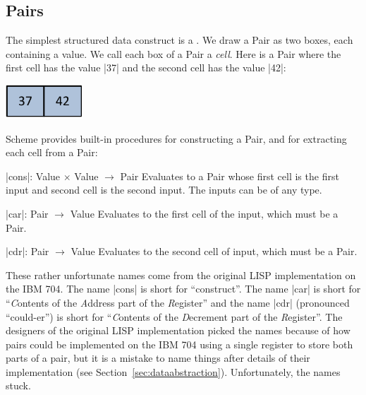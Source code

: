 \begin{schemeregion}
\section{Pairs}  

The simplest structured data construct is a .  We draw a Pair as two boxes, each containing a value.  We call each box of a Pair a \emph{cell}.  Here is a Pair where the first cell has the value \schemeresult|37| and the second cell has the value \schemeresult|42|:

\begin{centernospace}
\includegraphics[height=0.5in]{figures/pair.pdf}
\end{centernospace}

Scheme provides built-in procedures for constructing a Pair, and for extracting each cell from a Pair:

\begin{descriptionlist}
\item[\scheme|cons|: Value $\times$ Value $\rightarrow$ Pair] \forcenl Evaluates to a Pair whose first cell is the first input and second cell is the second input.  The inputs can be of any type.
\item[\scheme|car|: Pair $\rightarrow$ Value] \forcenl Evaluates to the first cell of the input, which must be a Pair.
\item[\scheme|cdr|: Pair $\rightarrow$ Value] \forcenl Evaluates to the second cell of input, which must be a Pair.
\end{descriptionlist}

These rather unfortunate names come from the original LISP implementation on the IBM 704.  The name \scheme|cons| is short for ``construct''.  The name \scheme|car| is short for ``\emph{C}ontents of the \emph{A}ddress part of the \emph{R}egister'' and the name \scheme|cdr| (pronounced ``could-er'') is short for ``\emph{C}ontents of the \emph{D}ecrement part of the \emph{R}egister''.  The designers of the original LISP implementation picked the names because of how pairs could be implemented on the IBM 704 using a single register to store both parts of a pair, but it is a mistake to name things after details of their implementation (see Section~\ref{sec:dataabstraction}).  Unfortunately, the names stuck.%
  

\end{schemeregion}
